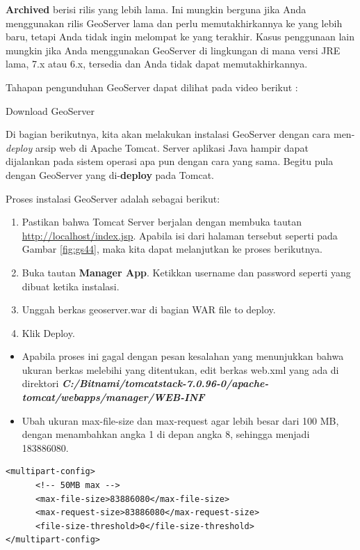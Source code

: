 \documentclass[]{book}
\begin{document}
\textbf{Archived} berisi rilis yang lebih lama. Ini mungkin berguna jika Anda menggunakan rilis GeoServer lama dan perlu memutakhirkannya ke yang lebih baru, tetapi Anda tidak ingin melompat ke yang terakhir. Kasus penggunaan lain mungkin jika Anda menggunakan GeoServer di lingkungan di mana versi JRE lama, 7.x atau 6.x, tersedia dan Anda tidak dapat memutakhirkannya.

Tahapan pengunduhan GeoServer dapat dilihat pada video berikut :

\label{fig:embed2}Download GeoServer

Di bagian berikutnya, kita akan melakukan instalasi GeoServer dengan cara men-\emph{deploy} arsip web di Apache Tomcat. Server aplikasi Java hampir dapat dijalankan pada sistem operasi apa pun dengan cara yang sama. Begitu pula dengan GeoServer yang di-\textbf{deploy} pada Tomcat.

Proses instalasi GeoServer adalah sebagai berikut:

\begin{enumerate}
\def\labelenumi{\arabic{enumi}.}
\item
  Pastikan bahwa Tomcat Server berjalan dengan membuka tautan \url{http://localhost/index.jsp}. Apabila isi dari halaman tersebut seperti pada Gambar \ref{fig:gs44}, maka kita dapat melanjutkan ke proses berikutnya.
\item
  Buka tautan \textbf{Manager App}. Ketikkan username dan password seperti yang dibuat ketika instalasi.
\item
  Unggah berkas geoserver.war di bagian WAR file to deploy.
\item
  Klik Deploy.
\end{enumerate}

\begin{itemize}
\item
  Apabila proses ini gagal dengan pesan kesalahan yang menunjukkan bahwa ukuran berkas melebihi yang ditentukan, edit berkas web.xml yang ada di direktori \textbf{\emph{C:/Bitnami/tomcatstack-7.0.96-0/apache-tomcat/webapps/manager/WEB-INF}}
\item
  Ubah ukuran max-file-size dan max-request agar lebih besar dari 100 MB, dengan menambahkan angka 1 di depan angka 8, sehingga menjadi 183886080.
\end{itemize}

\begin{verbatim}
<multipart-config>
      <!-- 50MB max -->
      <max-file-size>83886080</max-file-size>
      <max-request-size>83886080</max-request-size>
      <file-size-threshold>0</file-size-threshold>
</multipart-config>
\end{verbatim}
\end{document}
